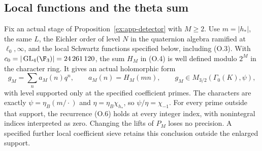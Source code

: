 \subsection{Local functions and the theta sum}
\begin{proposition}\label{ex:app-theta-form}
Fix an actual stage of Proposition~\ref{ex:app-detector} with $M\ge2$.
Use $m=|h_*|$, the same $L$, the Eichler order of level $N$ in the
quaternion algebra ramified at $\ell_0,\infty$, and the local
Schwartz functions specified below, including (O.3).
With $c_0=|\operatorname{GL}_4(\F_3)|=24\,261\,120$, the sum
$H_M$ in (O.4) is well defined modulo $2^M$ in the character ring.
It gives an actual holomorphic form
\[
 g_M=\sum_n a_M(n)q^n,\qquad a_M(n)=H_M(mn),
 \qquad g_M\in M_{3/2}(\Gamma_0(K),\psi),
\]
with level supported only at the specified coefficient primes.
The characters are exactly
$\psi=\eta_B(m/\cdot)$ and $\eta=\eta_B\chi_{h_*}$, so
$\psi/\eta=\chi_{-1}$. For every prime outside that support,
the recurrence (O.6) holds at every integer index, with nonintegral
indices interpreted as zero. Changing the lifts of $P_M$ loses no
precision. A specified further local coefficient sieve retains this
conclusion outside the enlarged support.
\end{proposition}
